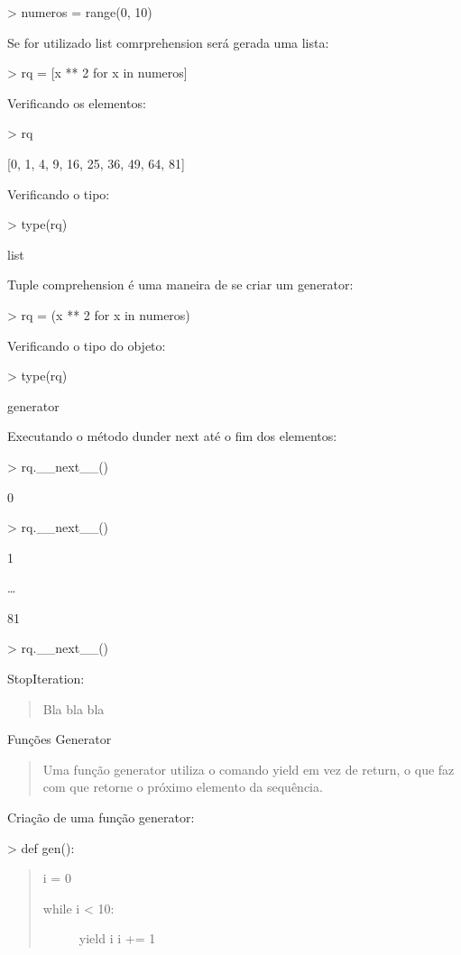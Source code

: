 \documentclass[letterpaper,10pt,brazil]{sphinxmanual}
\begin{document}
\textgreater{} numeros = range(0, 10)

Se for utilizado list comrprehension será gerada uma lista:

\textgreater{} rq = {[}x ** 2 for x in numeros{]}

Verificando os elementos:

\textgreater{} rq

{[}0, 1, 4, 9, 16, 25, 36, 49, 64, 81{]}

Verificando o tipo:

\textgreater{} type(rq)

list

Tuple comprehension é uma maneira de se criar um generator:

\textgreater{} rq = (x ** 2 for x in numeros)

Verificando o tipo do objeto:

\textgreater{} type(rq)

generator

Executando o método dunder next até o fim dos elementos:

\textgreater{} rq.\_\_next\_\_()

0

\textgreater{} rq.\_\_next\_\_()

1

…

81

\textgreater{} rq.\_\_next\_\_()

StopIteration:
\begin{quote}

Bla bla bla
\end{quote}

Funções Generator
\begin{quote}

Uma função generator utiliza o comando yield em vez de return, o que faz com que retorne o próximo elemento da sequência.
\end{quote}

Criação de uma função generator:

\textgreater{} def gen():
\begin{quote}

i = 0
\begin{description}
\item[{while i \textless{} 10:}] \leavevmode
yield i
i += 1

\end{description}
\end{quote}
\end{document}
